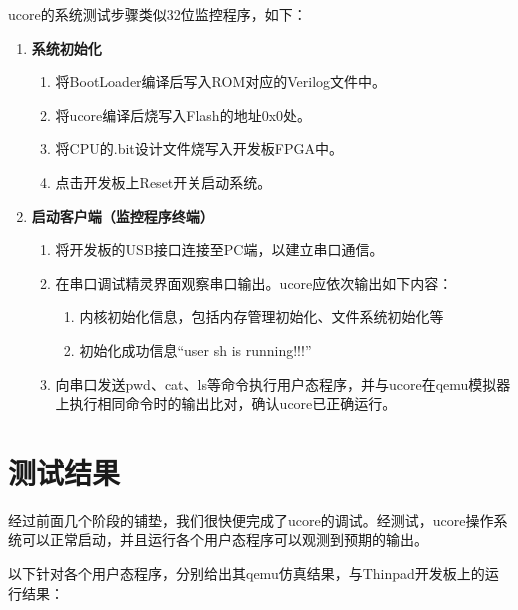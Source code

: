 ucore的系统测试步骤类似32位监控程序，如下：

\begin{enumerate}
    \item {\bf 系统初始化}

    \begin{enumerate}
        \item 将BootLoader编译后写入ROM对应的Verilog文件中。
        \item 将ucore编译后烧写入Flash的地址0x0处。
        \item 将CPU的.bit设计文件烧写入开发板FPGA中。
        \item 点击开发板上Reset开关启动系统。
    \end{enumerate}

    \item {\bf 启动客户端（监控程序终端）}

    \begin{enumerate}
        \item 将开发板的USB接口连接至PC端，以建立串口通信。
        \item 在串口调试精灵界面观察串口输出。ucore应依次输出如下内容：

        \begin{enumerate}
            \item 内核初始化信息，包括内存管理初始化、文件系统初始化等
            \item 初始化成功信息``user sh is running!!!''
        \end{enumerate}

        \item 向串口发送pwd、cat、ls等命令执行用户态程序，并与ucore在qemu模拟器上执行相同命令时的输出比对，确认ucore已正确运行。
    \end{enumerate}

\end{enumerate}

\section{测试结果}

经过前面几个阶段的铺垫，我们很快便完成了ucore的调试。经测试，ucore操作系统可以正常启动，并且运行各个用户态程序可以观测到预期的输出。

以下针对各个用户态程序，分别给出其qemu仿真结果，与Thinpad开发板上的运行结果：

\newcommand{\userapp}[1]{
    \subsection{#1}
    \image[5.5in]{qemu/#1}{#1 qemu仿真结果}
    \image[5.5in]{thinpad/#1}{#1 Thinpad运行结果}
}

